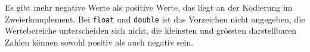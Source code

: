 \newline\newline
Es gibt mehr negative Werte als positive Werte, das liegt an der Kodierung im Zweierkomplement. Bei \texttt{float} und \texttt{double} ist das Vorzeichen nicht angegeben, die Wertebereiche unterscheiden sich nicht, die kleinsten und grössten darstellbaren Zahlen können sowohl positiv als auch negativ sein.

















